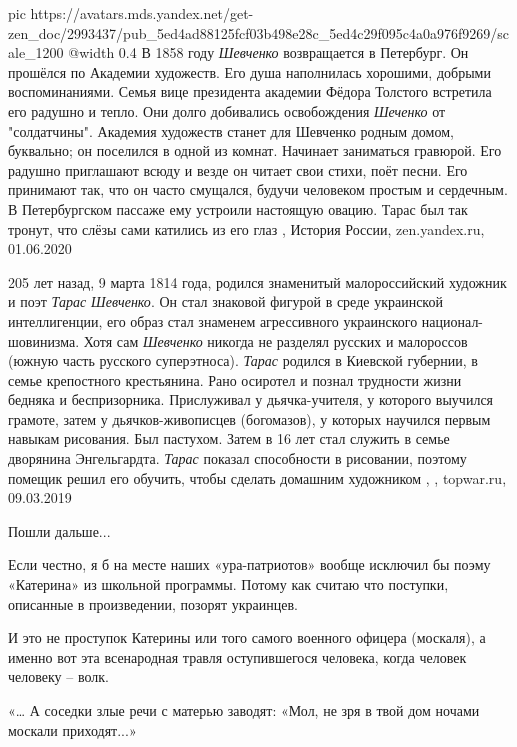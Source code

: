 \ifcmt
  pic https://avatars.mds.yandex.net/get-zen_doc/2993437/pub_5ed4ad88125fcf03b498e28c_5ed4c29f095c4a0a976f9269/scale_1200
  @width 0.4
\fi
В 1858 году \emph{Шевченко} возвращается в Петербург. Он прошёлся по Академии
художеств. Его душа наполнилась хорошими, добрыми воспоминаниями. Семья вице
президента академии Фёдора Толстого встретила его радушно и тепло. Они долго
добивались освобождения \emph{Шеченко} от "солдатчины".  Академия художеств станет для
Шевченко родным домом, буквально; он поселился в одной из комнат. Начинает
заниматься гравюрой. Его радушно приглашают всюду и везде он читает свои стихи,
поёт песни. Его принимают так, что он часто смущался, будучи человеком простым
и сердечным.  В Петербургском пассаже ему устроили настоящую овацию. Тарас был
так тронут, что слёзы сами катились из его глаз
, История России, zen.yandex.ru, 01.06.2020

205 лет назад, 9 марта 1814 года, родился знаменитый малороссийский художник и
поэт \emph{Тарас Шевченко}. Он стал знаковой фигурой в среде украинской интеллигенции,
его образ стал знаменем агрессивного украинского национал-шовинизма. Хотя сам
\emph{Шевченко} никогда не разделял русских и малороссов (южную часть русского
суперэтноса).  \emph{Тарас} родился в Киевской губернии, в семье крепостного
крестьянина. Рано осиротел и познал трудности жизни бедняка и беспризорника.
Прислуживал у дьячка-учителя, у которого выучился грамоте, затем у
дьячков-живописцев (богомазов), у которых научился первым навыкам рисования.
Был пастухом. Затем в 16 лет стал служить в семье дворянина Энгельгардта. \emph{Тарас}
показал способности в рисовании, поэтому помещик решил его обучить, чтобы
сделать домашним художником
, , topwar.ru, 09.03.2019

Пошли дальше...

Если честно, я б на месте наших «ура-патриотов» вообще исключил бы поэму
«Катерина» из школьной программы. Потому как считаю что поступки, описанные в
произведении, позорят украинцев.

И это не проступок Катерины или того самого военного офицера (москаля), а
именно вот эта всенародная травля оступившегося человека, когда человек
человеку – волк.

\obeycr
«… А соседки злые речи
с матерью заводят:
«Мол, не зря в твой дом ночами
москали приходят...»
\restorecr


